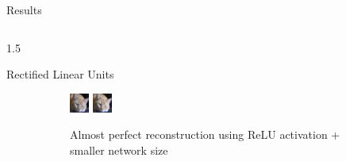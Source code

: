 \documentclass[final]{beamer}
\newlength{\onecolwid}
\newlength{\threecolwid}
\begin{document}
\begin{frame}[t]
\begin{columns}[t]
\begin{column}{\threecolwid}
\begin{alertblock}{Results}
\begin{columns}[t]
\begin{column}{1.5\onecolwid}
\begin{block}{Rectified Linear Units}
\begin{figure}
\begin{subfigure}{0.4\linewidth}
					\centering
					\includegraphics[width=0.4\linewidth]{graphics/reconstructions/cifar/relu/input_00_relu.png}
					\includegraphics[width=0.4\linewidth]{graphics/reconstructions/cifar/relu/reconstruction_00_relu.png}

					\caption{Almost perfect reconstruction using ReLU activation + smaller network size}

				\end{subfigure}
				\begin{subfigure}{0.4\linewidth}


\end{subfigure}
\end{figure}
\end{block}
\end{column}
\end{columns}
\end{alertblock}
\end{column}
\end{columns}
\end{frame}
\end{document}
